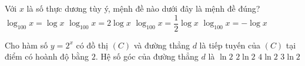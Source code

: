 \begin{ex}%
	Với $x$ là số thực dương tùy ý, mệnh đề nào dưới đây là mệnh đề đúng?
	\choice
	{$\log_{100}x=\log x$}
	{$\log_{100}x=2\log x$}
	{\True $\log_{100}x=\dfrac{1}{2}\log x$}
	{$\log_{100}x=-\log x$}
\end{ex}

\begin{ex}%
	Cho hàm số $y=2^x$ có đồ thị $(C)$ và đường thẳng $d$ là tiếp tuyến của $(C)$ tại điểm có hoành độ bằng $2$. Hệ số góc của đường thẳng $d$ là
	\choice
	{$\ln 2$}
	{$2\ln 2$}
	{\True $4\ln 2$}
	{$3\ln 2$}
\end{ex}


